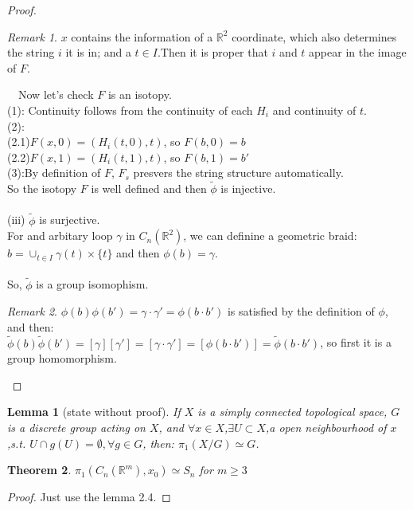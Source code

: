 \documentclass[UTF8]{ctexart}
\newtheorem{theorem}{Theorem}[section]
\newtheorem{lemma}[theorem]{Lemma}
\theoremstyle{definition}
\theoremstyle{remark}
\newtheorem*{remark}{Remark}
\begin{document}
\begin{proof}
\begin{remark}
	$x$ contains the information of a $\mathbb{R}^2$ coordinate, which also determines the string $i$ it is in; and a $t\in I$.Then it is proper that $i$ and $t$ appear in the image of $F$.
\end{remark}
~~Now let's check $F$ is an isotopy.\\
(1): Continuity follows from the continuity of each $H_i$ and continuity of $t$.\\
(2):\\(2.1)$F(x,0)=(H_i(t,0),t)$, so $F(b,0)=b$\\(2.2)$F(x,1)=(H_i(t,1),t)$, so $F(b,1)=b'$\\(3):By definition of $F$, $F_s$ presvers the string structure automatically.\\So the isotopy $F$ is well defined and then $\tilde{\phi}$ is  injective.\\\\(iii) $\tilde{\phi}$ is surjective.\\For and arbitary loop $\gamma$ in $C_n(\mathbb{R}^2)$, we can definine a geometric braid: $b=\cup_{t\in I} \gamma(t)\times\{t\} $ and then $\phi(b)=\gamma$.\\
\\So, $\tilde{\phi}$ is a group isomophism.\\\begin{remark} $\phi(b)\phi(b')=\gamma\cdot\gamma'=\phi(b\cdot b')$ is satisfied by the definition of $\phi$, and then:\\
	$\tilde{\phi}(b)\tilde{\phi}(b')=[\gamma][\gamma']=[\gamma\cdot\gamma']=[\phi(b\cdot b')]=\tilde{\phi}(b\cdot b')$, so first it is a group homomorphism. 
\end{remark}
\end{proof}
\begin{lemma}[state without proof]
	If $X$ is a simply connected topological space, $G$ is a discrete group acting on $X$, and $\forall x\in X$,$\exists U\subset X$,a open neighbourhood of $x$ ,s.t. $U\cap g(U)=\emptyset, \forall g\in G$, then: $\pi_1(X/G)\simeq G$.
\end{lemma}
\begin{theorem}
	$\pi_1(C_n(\mathbb{R}^m),x_0)\simeq S_n$ for $m\geq 3$
\end{theorem}
\begin{proof}
	Just use the lemma 2.4. 
\end{proof}
\end{document}
